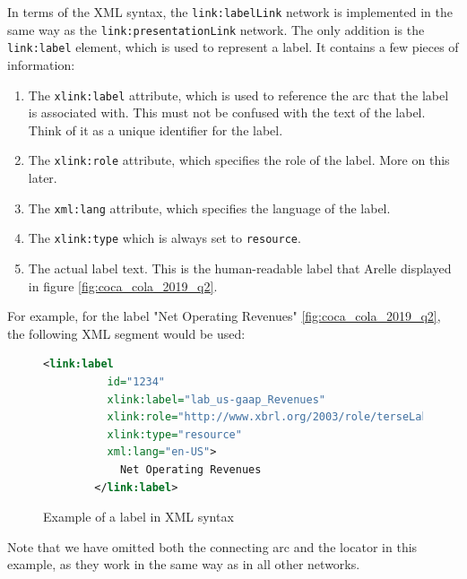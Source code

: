 In terms of the XML syntax, the \texttt{link:labelLink} network is implemented in the same way as the \texttt{link:presentationLink} network.
The only addition is the \texttt{link:label} element, which is used to represent a label.
It contains a few pieces of information:

\begin{enumerate}
    \item The \texttt{xlink:label} attribute, which is used to reference the arc that the label is associated with.
    This must not be confused with the text of the label.
    Think of it as a unique identifier for the label.
    \item The \texttt{xlink:role} attribute, which specifies the role of the label. More on this later.
    \item The \texttt{xml:lang} attribute, which specifies the language of the label.
    \item The \texttt{xlink:type} which is always set to \texttt{resource}.
    \item The actual label text. This is the human-readable label that Arelle displayed in figure \ref{fig:coca_cola_2019_q2}.
\end{enumerate}

For example, for the label "Net Operating Revenues" \ref{fig:coca_cola_2019_q2}, the following XML segment would be used:

\begin{figure}[H]
    \begin{lstlisting}[language=XML]
        <link:label 
          id="1234" 
          xlink:label="lab_us-gaap_Revenues" 
          xlink:role="http://www.xbrl.org/2003/role/terseLabel" 
          xlink:type="resource" 
          xml:lang="en-US">
            Net Operating Revenues
        </link:label>

    \end{lstlisting}
    \caption{Example of a label in XML syntax}
    \label{fig:example_label_xml}
\end{figure}

Note that we have omitted both the connecting arc and the locator in this example, 
as they work in the same way as in all other networks.


